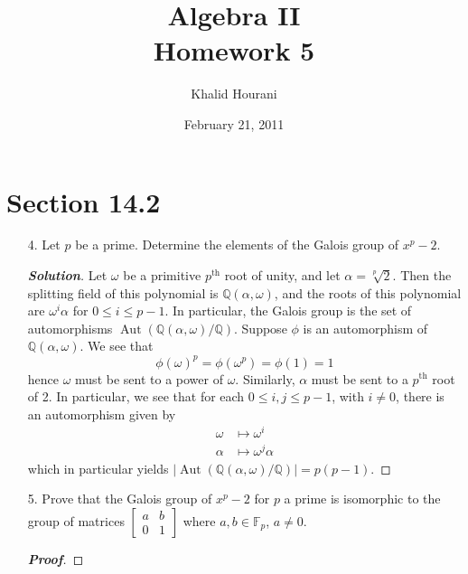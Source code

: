 \documentclass[12pt,leqno]{article}
\title{Algebra II\\\large Homework 5}
\date{February 21, 2011}
\author{Khalid Hourani}
\theoremstyle{definition}
\newcommand{\Aut}{\operatorname{Aut}}
\newcommand{\Q}{\mathbb{Q}}
\newcommand{\F}{\mathbb{F}}
\newenvironment{Proof}{\begin{proof}[\textnormal{\textbf{Proof}}]}{\end{proof}}
\newenvironment{Solution}{\begin{proof}[\textnormal{\textbf{Solution}}]}{\end{proof}}
\begin{document}
 \begin{titlepage}
  \maketitle
 \end{titlepage}

\section*{Section 14.2}
  \begin{enumerate}
   \item [4.] Let $p$ be a prime. Determine the elements of the Galois group of $x^p-2$.
    \begin{Solution}
     Let $\omega$ be a primitive $p^{\text{th}}$ root of unity, and let $\alpha=\sqrt[p]{2}$. Then the splitting field of this polynomial is $\Q(\alpha,\omega)$, and the roots of this polynomial are $\omega^i\alpha$ for $0\leq i\leq p-1$. In particular, the Galois group is the set of automorphisms $\Aut(\Q(\alpha,\omega)/\Q)$. Suppose $\phi$ is an automorphism of $\Q(\alpha,\omega)$. We see that \[\phi(\omega)^p=\phi(\omega^p)=\phi(1)=1\] hence $\omega$ must be sent to a power of $\omega$. Similarly, $\alpha$ must be sent to a $p^{\text{th}}$ root of 2. In particular, we see that for each $0\leq i,j\leq p-1$, with $i\not=0$, there is an automorphism given by \begin{align*}\omega&\mapsto\omega^i\\\alpha&\mapsto\omega^j\alpha\end{align*} which in particular yields $|\Aut(\Q(\alpha,\omega)/\Q)|=p(p-1)$.
    \end{Solution}
   \item [5.] Prove that the Galois group of $x^p-2$ for $p$ a prime is isomorphic to the group of matrices $\begin{bmatrix}a&b\\0&1\end{bmatrix}$ where $a,b\in\F_p$, $a\not=0$.
    \begin{Proof}

\end{Proof}
\end{enumerate}
\end{document}

